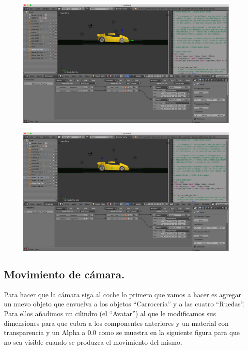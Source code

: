 \documentclass[10pt]{article}
\begin{document}
\begin{figure}[H]
	\begin{center}
	 		\includegraphics[width = 1.00\textwidth]{Imagenes/p4-img15}
	\end{center} 
\end{figure}

\begin{figure}[H]
	\begin{center}
	 		\includegraphics[width = 1.00\textwidth]{Imagenes/p4-img16}
	\end{center} 
\end{figure}


\subsection{Movimiento de cámara.}
Para hacer que la cámara siga al coche lo primero que vamos a hacer es agregar un nuevo objeto que envuelva a los objetos ``Carrocería'' y a las cuatro ``Ruedas''. Para ellos añadimos un cilindro (el ``Avatar'') al que le modificamos sus dimensiones para que cubra a los componentes anteriores y un material con transparencia y un Alpha a 0.0 como se muestra en la siguiente figura para que no sea visible cuando se produzca el movimiento del mismo. \\
\end{document}
